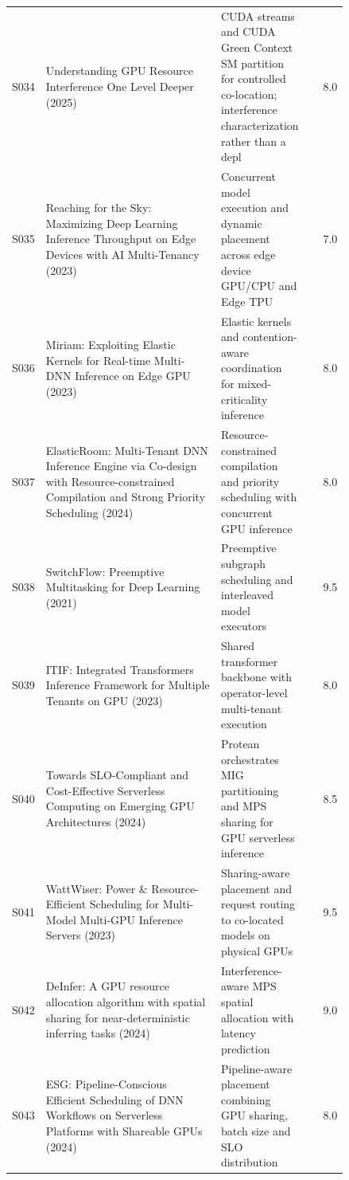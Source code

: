 \begin{longtable}{P{0.105\linewidth}P{0.52\linewidth}P{0.22\linewidth}r}
S034 & Understanding GPU Resource Interference One Level Deeper (2025) \cite{interference_deeper} & CUDA streams and CUDA Green Context SM partition for controlled co-location; interference characterization rather than a depl & 8.0 \\
S035 & Reaching for the Sky: Maximizing Deep Learning Inference Throughput on Edge Devices with AI Multi-Tenancy (2023) \cite{edge_sky} & Concurrent model execution and dynamic placement across edge device GPU/CPU and Edge TPU & 7.0 \\
S036 & Miriam: Exploiting Elastic Kernels for Real-time Multi-DNN Inference on Edge GPU (2023) \cite{miriam} & Elastic kernels and contention-aware coordination for mixed-criticality inference & 8.0 \\
S037 & ElasticRoom: Multi-Tenant DNN Inference Engine via Co-design with Resource-constrained Compilation and Strong Priority Scheduling (2024) \cite{elasticroom} & Resource-constrained compilation and priority scheduling with concurrent GPU inference & 8.0 \\
S038 & SwitchFlow: Preemptive Multitasking for Deep Learning (2021) \cite{switchflow} & Preemptive subgraph scheduling and interleaved model executors & 9.5 \\
S039 & ITIF: Integrated Transformers Inference Framework for Multiple Tenants on GPU (2023) \cite{itif} & Shared transformer backbone with operator-level multi-tenant execution & 8.0 \\
S040 & Towards SLO-Compliant and Cost-Effective Serverless Computing on Emerging GPU Architectures (2024) \cite{protean} & Protean orchestrates MIG partitioning and MPS sharing for GPU serverless inference & 8.5 \\
S041 & WattWiser: Power \& Resource-Efficient Scheduling for Multi-Model Multi-GPU Inference Servers (2023) \cite{wattwiser} & Sharing-aware placement and request routing to co-located models on physical GPUs & 9.5 \\
S042 & DeInfer: A GPU resource allocation algorithm with spatial sharing for near-deterministic inferring tasks (2024) \cite{deinfer} & Interference-aware MPS spatial allocation with latency prediction & 9.0 \\
S043 & ESG: Pipeline-Conscious Efficient Scheduling of DNN Workflows on Serverless Platforms with Shareable GPUs (2024) \cite{esg} & Pipeline-aware placement combining GPU sharing, batch size and SLO distribution & 8.0 \\
\bottomrule\end{longtable}
